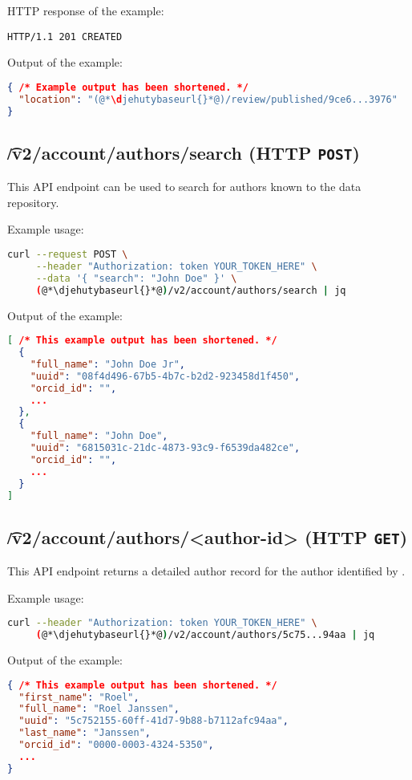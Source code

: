   HTTP response of the example:
\begin{lstlisting}
HTTP/1.1 201 CREATED
\end{lstlisting}

  Output of the example:
\begin{lstlisting}[language=JSON]
{ /* Example output has been shortened. */
  "location": "(@*\djehutybaseurl{}*@)/review/published/9ce6...3976"
}
\end{lstlisting}

\subsection{\t{/v2/account/authors/search} (HTTP \texttt{POST})}

  This API endpoint can be used to search for authors known to the data
  repository.

  Example usage:
\begin{lstlisting}[language=bash]
curl --request POST \
     --header "Authorization: token YOUR_TOKEN_HERE" \
     --data '{ "search": "John Doe" }' \
     (@*\djehutybaseurl{}*@)/v2/account/authors/search | jq
\end{lstlisting}

  Output of the example:
\begin{lstlisting}[language=JSON]
[ /* This example output has been shortened. */
  {
    "full_name": "John Doe Jr",
    "uuid": "08f4d496-67b5-4b7c-b2d2-923458d1f450",
    "orcid_id": "",
    ...
  },
  {
    "full_name": "John Doe",
    "uuid": "6815031c-21dc-4873-93c9-f6539da482ce",
    "orcid_id": "",
    ...
  }
]
\end{lstlisting}

\subsection{\t{/v2/account/authors/<author-id>} (HTTP \texttt{GET})}

  This API endpoint returns a detailed author record for the author identified
  by \code{author-id}.

  Example usage:
\begin{lstlisting}[language=bash]
curl --header "Authorization: token YOUR_TOKEN_HERE" \
     (@*\djehutybaseurl{}*@)/v2/account/authors/5c75...94aa | jq
\end{lstlisting}

  Output of the example:
\begin{lstlisting}[language=JSON]
{ /* This example output has been shortened. */
  "first_name": "Roel",
  "full_name": "Roel Janssen",
  "uuid": "5c752155-60ff-41d7-9b88-b7112afc94aa",
  "last_name": "Janssen",
  "orcid_id": "0000-0003-4324-5350",
  ...
}
\end{lstlisting}

